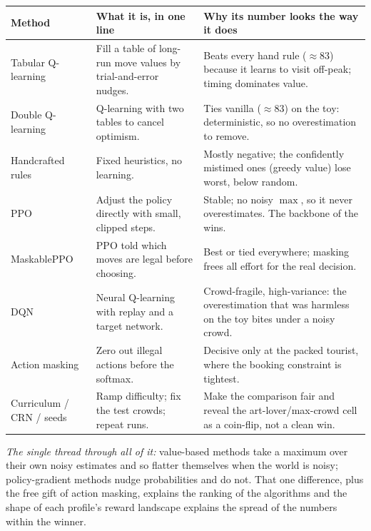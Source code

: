 \documentclass[11pt]{article}
\begin{document}
\renewcommand{\arraystretch}{1.35}
\begin{center}
\begin{tabular}{p{2.7cm} p{5.2cm} p{6.4cm}}
\toprule
\textbf{Method} & \textbf{What it is, in one line} & \textbf{Why its number looks the way it does} \\
\midrule
Tabular Q-learning & Fill a table of long-run move values by trial-and-error nudges. & Beats every hand rule ($\approx 83$) because it learns to visit off-peak; timing dominates value. \\
Double Q-learning & Q-learning with two tables to cancel optimism. & Ties vanilla ($\approx 83$) on the toy: deterministic, so no overestimation to remove. \\
Handcrafted rules & Fixed heuristics, no learning. & Mostly negative; the confidently mistimed ones (greedy value) lose worst, below random. \\
PPO & Adjust the policy directly with small, clipped steps. & Stable; no noisy $\max$, so it never overestimates. The backbone of the wins. \\
MaskablePPO & PPO told which moves are legal before choosing. & Best or tied everywhere; masking frees all effort for the real decision. \\
DQN & Neural Q-learning with replay and a target network. & Crowd-fragile, high-variance: the overestimation that was harmless on the toy bites under a noisy crowd. \\
Action masking & Zero out illegal actions before the softmax. & Decisive only at the packed tourist, where the booking constraint is tightest. \\
Curriculum / CRN / seeds & Ramp difficulty; fix the test crowds; repeat runs. & Make the comparison fair and reveal the art-lover/max-crowd cell as a coin-flip, not a clean win. \\
\bottomrule
\end{tabular}
\end{center}

\vspace{1em}
\noindent\emph{The single thread through all of it:} value-based methods take a maximum
over their own noisy estimates and so flatter themselves when the world is noisy;
policy-gradient methods nudge probabilities and do not. That one difference, plus the free
gift of action masking, explains the ranking of the algorithms and the shape of each
profile's reward landscape explains the spread of the numbers within the winner.
\end{document}
